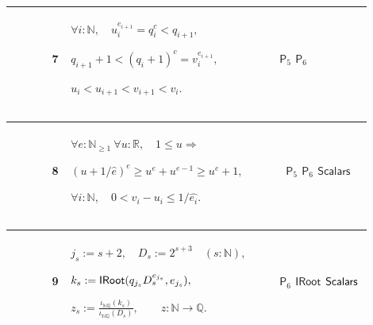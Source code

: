 \documentclass[12pt,reqno]{amsart}
\theoremstyle{blueplain}
\numberwithin{equation}{section}
\begin{document}
{\scriptsize \setlength{\parskip}{0pt}\nointerlineskip
\noindent 
\begin{tabular}{|@{}>{\centering\arraybackslash}m{0.10658\linewidth}|>{\centering\arraybackslash}m{0.03553\linewidth}|>{\centering\arraybackslash}m{0.52105\linewidth}|>{\centering\arraybackslash}m{0.23684\linewidth}|}
\hline
{\hypertarget{row:P7}{$\mathsf{P}$}} & {7} & {$\displaystyle \forall i:%
\mathbb{N},\quad u_i^{e_{i+1}}=q_i^c<q_{i+1},$ \par$\displaystyle %
q_{i+1}+1<(q_i+1)^c=v_i^{e_{i+1}},$ \par$\displaystyle %
u_i<u_{i+1}<v_{i+1}<v_i.$} & {\hyperlink{row:P5}{$\mathsf{P}_{5}$} 
\hyperlink{row:P6}{$\mathsf{P}_{6}$}} \\ \hline
\end{tabular}%
}

{\scriptsize \setlength{\parskip}{0pt}\nointerlineskip
\noindent 
\begin{tabular}{|@{}>{\centering\arraybackslash}m{0.10658\linewidth}|>{\centering\arraybackslash}m{0.03553\linewidth}|>{\centering\arraybackslash}m{0.52105\linewidth}|>{\centering\arraybackslash}m{0.23684\linewidth}|}
\hline
{\hypertarget{row:P8}{$\mathsf{P}$}} & {8} & {$\displaystyle \forall e:%
\mathbb{N}_{\ge1}\ \forall u:\mathbb{R},\quad1\le u\Rightarrow$ \par$%
\displaystyle (u+1/\widehat e)^e\ge u^e+u^{e-1}\ge u^e+1,$ \par$%
\displaystyle \forall i:\mathbb{N},\quad0<v_i-u_i\le1/\widehat{e_i}.$} & {\ 
\hyperlink{row:P5}{$\mathsf{P}_{5}$} \hyperlink{row:P6}{$\mathsf{P}_{6}$} 
\hyperlink{def:Scalars}{$\mathsf{Scalars}$}} \\ \hline
\end{tabular}%
}

{\scriptsize \setlength{\parskip}{0pt}\nointerlineskip
\noindent 
\begin{tabular}{|@{}>{\centering\arraybackslash}m{0.10658\linewidth}|>{\centering\arraybackslash}m{0.03553\linewidth}|>{\centering\arraybackslash}m{0.52105\linewidth}|>{\centering\arraybackslash}m{0.23684\linewidth}|}
\hline
{\hypertarget{row:P9}{$\mathsf{P}$}} & {9} & {$\displaystyle j_s:=s+2,\quad
D_s:=2^{s+3}\quad(s:\mathbb{N}),$ \par$\displaystyle k_s:=\hyperlink{def:IRoot}%
{\mathsf{IRoot} }(q_{j_s}D_s^{e_{j_s}},e_{j_s}),$ \par$\displaystyle z_s:=%
\frac{\iota_{\mathbb{N}\mathbb{Q}}(k_s)}{\iota_{\mathbb{N}\mathbb{Q}}(D_s)}%
,\qquad z:\mathbb{N}\to\mathbb{Q}.$} & {\hyperlink{row:P6}{$\mathsf{P}_{6}$} 
\hyperlink{def:IRoot}{$\mathsf{IRoot}$} \hyperlink{def:Scalars}{$\mathsf{%
Scalars}$}} \\ \hline
\end{tabular}%
}
\end{document}
